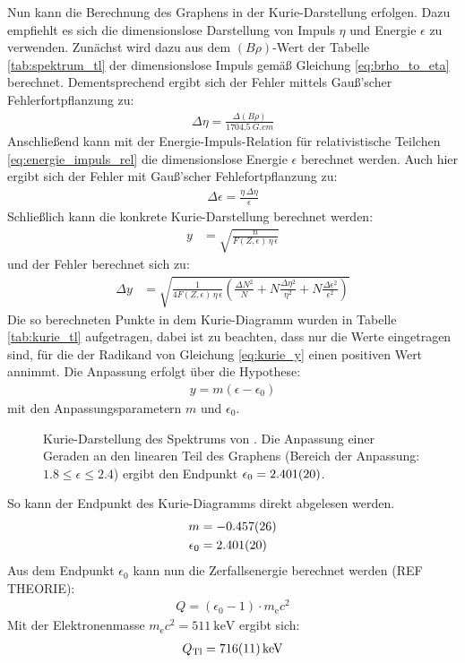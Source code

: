 \documentclass[11pt, a4paper]{article}
\numberwithin{equation}{section}
\begin{document}
Nun kann die Berechnung des Graphens in der Kurie-Darstellung erfolgen.
Dazu empfiehlt es sich die dimensionslose Darstellung von Impuls $\eta$ und Energie $\epsilon$ zu verwenden.
Zunächst wird dazu aus dem $(B \rho)$-Wert der Tabelle \ref{tab:spektrum_tl} der dimensionslose Impuls gemäß Gleichung \eqref{eq:brho_to_eta} berechnet.
Dementsprechend ergibt sich der Fehler mittels Gauß'scher Fehlerfortpflanzung zu:
\begin{align*}
	\Delta \eta = \frac{\Delta (B \rho)}{\SI{1704.5}{G.cm}}
\end{align*}
Anschließend kann mit der Energie-Impuls-Relation für relativistische Teilchen \eqref{eq:energie_impuls_rel} die dimensionslose Energie $\epsilon$ berechnet werden.
Auch hier ergibt sich der Fehler mit Gauß'scher Fehlefortpflanzung zu:
\begin{align*}
	\Delta \epsilon = \frac{\eta \, \Delta \eta}{\epsilon}
\end{align*}
Schließlich kann die konkrete Kurie-Darstellung berechnet werden:
\begin{align}
	y &= \sqrt{\frac{n}{F(Z,\epsilon) \, \eta \, \epsilon}}
	\label{eq:kurie_y}
\end{align}
und der Fehler berechnet sich zu:
\begin{align}
	\Delta y &= 
	\sqrt{\frac{1}{4 F(Z, \epsilon) \, \eta \, \epsilon}
	\left( \frac{\Delta N^2}{N} + N \frac{\Delta \eta^2}{\eta^2} + N \frac{\Delta \epsilon^2}{\epsilon^2} \right)
	}
\end{align}
Die so berechneten Punkte in dem Kurie-Diagramm wurden in Tabelle \ref{tab:kurie_tl} aufgetragen, dabei ist zu beachten, dass nur die Werte eingetragen sind, für die der Radikand von Gleichung \ref{eq:kurie_y} einen positiven Wert annimmt.
Die Anpassung erfolgt über die Hypothese:
\begin{align}
	y = m (\epsilon - \epsilon_0)
\end{align}
mit den Anpassungsparametern $m$ und $\epsilon_0$.
\begin{figure}[h]
	\centering
	
	\caption{Kurie-Darstellung des Spektrums von . Die Anpassung einer Geraden an den linearen Teil des Graphens (Bereich der Anpassung: $\num{1.8} \leq \epsilon \leq {2.4}$) ergibt den Endpunkt $\epsilon_0 = \num{2.401 +- 0.020}$.}
	\label{fig:thallium_kurie}
\end{figure}
So kann der Endpunkt des Kurie-Diagramms direkt abgelesen werden.
\begin{align}
	m &= \num{-0.457 +- 0.026} \\
	\epsilon_0 &= \num{2.401 +- 0.020}
\end{align}
Aus dem Endpunkt $\epsilon_0$ kann nun die Zerfallsenergie berechnet werden (REF THEORIE):
\begin{align}
	Q = (\epsilon_0 - 1) \cdot m_\mathrm{e} c^2
\end{align}
Mit der Elektronenmasse $m_\mathrm{e} c^2 = \SI{511}{\kilo\electronvolt}$ ergibt sich:
\begin{align}
	Q_\mathrm{Tl} = \SI{716 +- 11}{\kilo\electronvolt}
\end{align}
\end{document}
